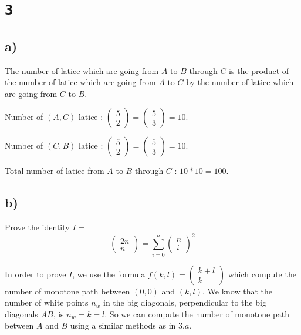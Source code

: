 \documentclass[a4paper,11pt]{report}
\begin{document}
\section*{\texttt{3}}
\subsection*{a)}

The number of latice which are going from $A$ to $B$ through $C$ is the product of
the number of latice which are going from $A$ to $C$ by the number of latice
which are going from $C$ to $B$.

Number of $(A,C)$ latice : $\begin{pmatrix} 5 \\ 2\end{pmatrix}
= \begin{pmatrix} 5  \\ 3\end{pmatrix} = 10$.

Number of $(C,B)$ latice : $\begin{pmatrix} 5 \\ 2\end{pmatrix}
= \begin{pmatrix} 5  \\ 3\end{pmatrix} = 10$.

Total number of latice from $A$ to $B$ through $C$ : $10 * 10 = 100$.

\subsection*{b)}

Prove the identity $I = $
$$
\begin{pmatrix} 2n \\ n\end{pmatrix} = \sum_{i=0}^{n} \begin{pmatrix} n \\ i\end{pmatrix}^2
$$

In order to prove $I$, we use the formula $f(k,l) = \begin{pmatrix} k+l \\
  k\end{pmatrix}$ which compute the number of monotone path between $(0,0)$ and
$(k,l)$. We know that the number of white points $n_w$ in the big diagonals,
perpendicular to the big diagonals $AB$, is $n_w = k = l$. So we can compute the
number of monotone path between $A$ and $B$ using a similar methods as in $3.a$.
\end{document}

